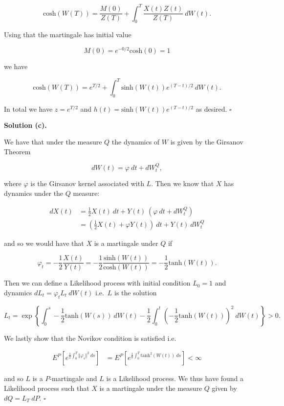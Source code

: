 \documentclass[
]{book}
\begin{document}
\[
\text{cosh}(W(T))=\frac{M(0)}{Z(T)}+\int_0^T\frac{X(t)Z(t)}{Z(T)}\ dW(t).
\]

Using that the martingale has initial value

\[
M(0)=e^{-0/2}\text{cosh}(0)=1
\]

we have

\[
\text{cosh}(W(T))=e^{T/2}+\int_0^T \text{sinh}(W(t))e^{(T-t)/2}\ dW(t).
\]

In total we have \(z=e^{T/2}\) and \(h(t)=\text{sinh}(W(t))e^{(T-t)/2}\) as desired. \(\square\)

\noindent\makebox[\linewidth]{\rule{\textwidth}{0.4pt}}

\textbf{Solution (c).}

We have that under the measure \(Q\) the dynamics of \(W\) is given by the Girsanov Theorem

\[
dW(t)=\varphi\ dt+dW^Q_t,
\]

where \(\varphi\) is the Girsanov kernel associated with \(L\). Then we know that \(X\) has dynamics under the \(Q\) measure:

\begin{align*}
dX(t)&=\frac{1}{2}X(t)\ dt+Y(t)\ (\varphi\ dt+dW^Q_t)\\
&=\left(\frac{1}{2}X(t)+\varphi Y(t)\right)\ dt+Y(t)\ dW^Q_t
\end{align*}

and so we would have that \(X\) is a martingale under \(Q\) if

\[
\varphi_t=-\frac{1}{2}\frac{X(t)}{Y(t)}=-\frac{1}{2}\frac{\text{sinh}(W(t))}{\text{cosh}(W(t))}=-\frac{1}{2}\text{tanh}(W(t)).
\]

Then we can define a Likelihood process with initial condition \(L_0=1\) and dynamics \(dL_t=\varphi_tL_t\ dW(t)\) i.e.~\(L\) is the solution

\[
L_t=\exp\left\{\int_0^s-\frac{1}{2}\text{tanh}(W(s)) \ dW(t)-\frac{1}{2}\int_0^t\left(-\frac{1}{2}\text{tanh}(W(t))\right)^2 \ dW(t)\right\}> 0.
\]

We lastly show that the Novikov condition is satisfied i.e.

\begin{align*}
E^P\left[e^{\frac{1}{2}\int_0^T\Vert \varphi_s\Vert^2\ ds}\right]&=E^P\left[e^{\frac{1}{8}\int_0^T\text{tanh}^2(W(t))\ ds}\right]<\infty
\end{align*}

and so \(L\) is a \(P\)-martingale and \(L\) is a Likelihood process. We thus have found a Likelihood process such that \(X\) is a martingale under the measure \(Q\) given by \(dQ=L_T\ dP\). \(\square\)
\end{document}
